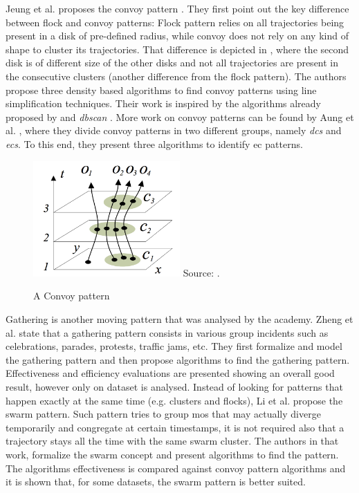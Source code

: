 Jeung et al. proposes the convoy pattern \citep{convoy2}\citep{convoy}. They first point out the key difference between
flock and convoy patterns: Flock pattern relies on all trajectories being present in a disk of pre-defined radius, while
convoy does not rely on any kind of shape to cluster its trajectories. That difference is depicted in
, where the second disk is of different size of the other disks and not all trajectories are
present in the consecutive clusters (another difference from the flock pattern). The authors propose three density based
algorithms to find convoy patterns using line simplification techniques. Their work is inspired by the algorithms
already proposed by \citep{movingclusters} and \textit{\ac{dbscan}} \citep{dbscan}. More work on convoy patterns can be
found by Aung et al. \citep{convoy3}, where they divide convoy patterns in two different groups, namely
\textit{\acp{dc}} and \textit{\acp{ec}}. To this end, they present three algorithms to identify \ac{ec} patterns.

\begin{figure}
    \centering
    \caption{A Convoy pattern}
    \includegraphics[width=0.5\textwidth]{images/convoy.png}
    \footnotesize{Source: \citep{convoy2}.}
    \label{fig:convoy_pattern}
\end{figure}

Gathering is another moving pattern that was analysed by the academy. Zheng et al. \citep{gathering} state that a
gathering pattern consists in various group incidents such as celebrations, parades, protests, traffic jams, etc. They
first formalize and model the gathering pattern and then propose algorithms to find the gathering pattern. Effectiveness
and efficiency evaluations are presented showing an overall good result, however only on dataset is analysed. Instead of
looking for patterns that happen exactly at the same time (e.g. clusters and flocks), Li et al. \citep{swarm} propose
the swarm pattern. Such pattern tries to group \acp{mo} that may actually diverge temporarily and congregate at certain
timestamps, it is not required also that a trajectory stays all the time with the same swarm cluster. The authors in
that work, formalize the swarm concept and present algorithms to find the pattern. The algorithms effectiveness is
compared against convoy pattern algorithms and it is shown that, for some datasets, the swarm pattern is better suited.

